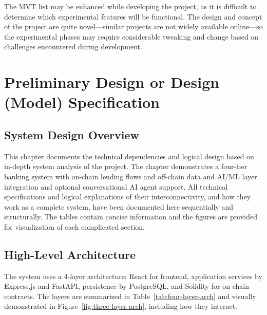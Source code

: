 The MVT list may be enhanced while developing the project, as it is difficult to determine which experimental features will be functional. The design and concept of the project are quite novel---similar projects are not widely available online---so the experimental phases may require considerable tweaking and change based on challenges encountered during development.

\section{Preliminary Design or Design (Model) Specification}
\label{sec:preliminary-design-specification}

\subsection{System Design Overview}
\label{sec:prototype-scope}
This chapter documents the technical dependencies and logical design based on in-depth system analysis of the project. The chapter demonstrates a four-tier banking system with on-chain lending flows and off-chain data and AI/ML layer integration and optional conversational AI agent support. All technical specifications and logical explanations of their interconnectivity, and how they work as a complete system, have been documented here sequentially and structurally. The tables contain concise information and the figures are provided for visualization of each complicated section.

\subsection{High-Level Architecture}
\label{sec:high-level-arch}

The system uses a 4-layer architecture: React for frontend, application services by Express.js and FastAPI, persistence by PostgreSQL, and Solidity for on-chain contracts. The layers are summarized in Table~\ref{tab:four-layer-arch} and visually demonstrated in Figure~\ref{fig:three-layer-arch}, including how they interact.

